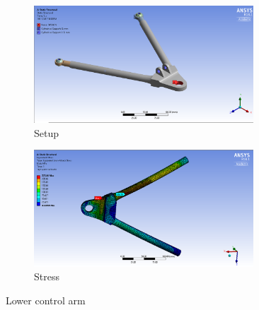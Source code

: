 \documentclass[10pt]{article}
\begin{document}
\begin{figure}[H]
\centering
\begin{subfigure}[b]{.48\textwidth}
\centering
\includegraphics[width=0.9\textwidth]{figures/fea/parts/MS00018-LowerControlArm-Setup}
\caption{Setup}
\end{subfigure}
\begin{subfigure}[b]{.48\textwidth}
\centering
\includegraphics[width=0.9\textwidth]{figures/fea/parts/MS00018-LowerControlArm-Stress}
\caption{Stress}
\end{subfigure}
\caption{Lower control arm}
\label{fig:MS00018-LowerControlArm}
\end{figure}
\end{document}
